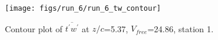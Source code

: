 \begin{figure}[H]
\centering
\texttt{[image: figs/run\_6/run\_6\_tw\_contour]}
\caption{Contour plot of $\overline{t^\prime w^\prime}$ at $z/c$=5.37, $V_{free}$=24.86, station 1.}
\label{fig:run_6_tw_contour}
\end{figure}


